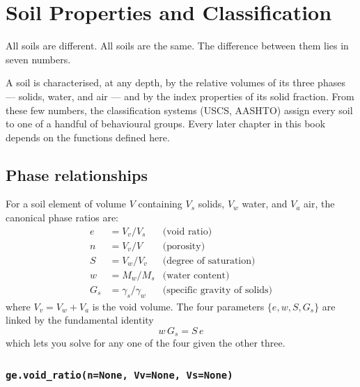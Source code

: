 \documentclass[11pt,a4paper,openany]{book}
\newcommand{\gammaw}{\gamma_w}
\begin{document}
\chapter{Soil Properties and Classification}\label{ch:soil}

\epigraph{All soils are different. All soils are the same.
The difference between them lies in seven numbers.}{}

\noindent
A soil is characterised, at any depth, by the relative volumes of
its three phases --- solids, water, and air --- and by the index
properties of its solid fraction. From these few numbers, the
classification systems (USCS, AASHTO) assign every soil to one
of a handful of behavioural groups. Every later chapter in this
book depends on the functions defined here.

\section{Phase relationships}\label{sec:phase}

For a soil element of volume $V$ containing $V_s$ solids, $V_w$
water, and $V_a$ air, the canonical phase ratios are:
\begin{align}
e   &= V_v / V_s                  &\text{(void ratio)}\\
n   &= V_v / V                    &\text{(porosity)}\\
S   &= V_w / V_v                  &\text{(degree of saturation)}\\
w   &= M_w / M_s                  &\text{(water content)}\\
G_s &= \gamma_s / \gammaw         &\text{(specific gravity of solids)}
\end{align}
where $V_v = V_w + V_a$ is the void volume. The four parameters
$\{e, w, S, G_s\}$ are linked by the fundamental identity
\begin{equation}\label{eq:weGs}
\boxed{\;w \, G_s = S \, e \;}
\end{equation}
which lets you solve for any one of the four given the other
three.

\subsection{\texttt{ge.void\_ratio(n=None, Vv=None, Vs=None)}}
\end{document}
